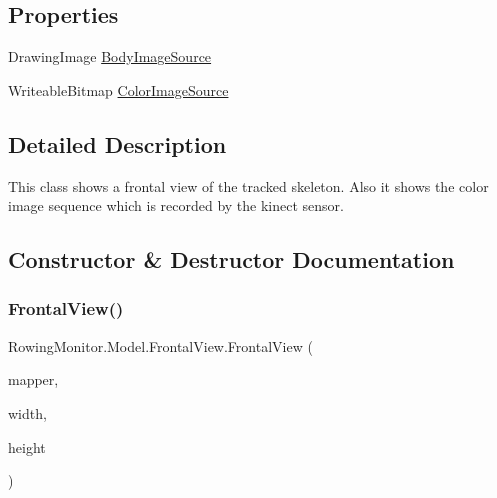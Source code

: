 \subsection*{Properties}
\begin{DoxyCompactItemize}
\item 
Drawing\+Image \hyperlink{class_rowing_monitor_1_1_model_1_1_frontal_view_a5761942e513e1b5389ca9c72da6e8b29}{Body\+Image\+Source}
\item 
Writeable\+Bitmap \hyperlink{class_rowing_monitor_1_1_model_1_1_frontal_view_a0f47cf3abfe77c81f15735301a04c5af}{Color\+Image\+Source}
\end{DoxyCompactItemize}


\subsection{Detailed Description}
This class shows a frontal view of the tracked skeleton. Also it shows the color image sequence which is recorded by the kinect sensor. 



\subsection{Constructor \& Destructor Documentation}
\mbox{\label{class_rowing_monitor_1_1_model_1_1_frontal_view_aa02b93cf606fc1d6fb0159ed39a53f5c}} 
\subsubsection{\texorpdfstring{Frontal\+View()}{FrontalView()}}
{\footnotesize\ttfamily Rowing\+Monitor.\+Model.\+Frontal\+View.\+Frontal\+View (\begin{DoxyParamCaption}\item[{Coordinate\+Mapper}]{mapper,  }\item[{int}]{width,  }\item[{int}]{height }\end{DoxyParamCaption})}



